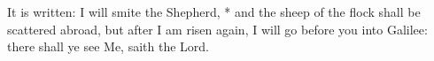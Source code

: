 It is written: I will smite the Shepherd, * and the sheep of the flock shall be scattered abroad, but after I am risen again, I will go before you into Galilee: there shall ye see Me, saith the Lord.